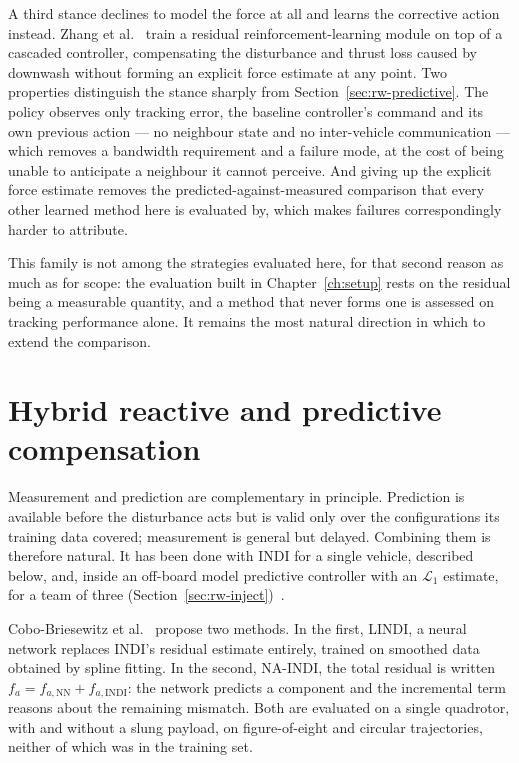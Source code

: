 A third stance declines to model the force at all and learns the corrective action instead. Zhang
et al.~\cite{zhang2024proxfly} train a residual reinforcement-learning module on top of a cascaded
controller, compensating the disturbance and thrust loss caused by downwash without forming an
explicit force estimate at any point. Two properties distinguish the stance sharply from
Section~\ref{sec:rw-predictive}. The policy observes only tracking error, the baseline controller's
command and its own previous action --- no neighbour state and no inter-vehicle communication ---
which removes a bandwidth requirement and a failure mode, at the cost of being unable to anticipate
a neighbour it cannot perceive. And giving up the explicit force estimate removes the
predicted-against-measured comparison that every other learned method here is evaluated by, which
makes failures correspondingly harder to attribute.

This family is not among the strategies evaluated here, for that second reason as much as for
scope: the evaluation built in Chapter~\ref{ch:setup} rests on the residual being a measurable
quantity, and a method that never forms one is assessed on tracking performance alone. It remains
the most natural direction in which to extend the comparison.

\section{Hybrid reactive and predictive compensation}
\label{sec:rw-hybrid}

Measurement and prediction are complementary in principle. Prediction is available before the
disturbance acts but is valid only over the configurations its training data covered; measurement
is general but delayed. Combining them is therefore natural. It has been done with INDI for a single
vehicle, described below, and, inside an off-board model predictive controller with an
$\mathcal{L}_1$ estimate, for a team of three (Section~\ref{sec:rw-inject})~\cite{hsieh2025onlineadaptation}.

Cobo-Briesewitz et al.~\cite{cobobriesewitz2026lindi} propose two methods. In the first, LINDI, a
neural network replaces INDI's residual estimate entirely, trained on smoothed data obtained by
spline fitting. In the second, NA-INDI, the total residual is written \(f_a = f_{a,\mathrm{NN}} +
f_{a,\mathrm{INDI}}\): the network predicts a component and the incremental term reasons about the
remaining mismatch. Both are evaluated on a single quadrotor, with and without
a slung payload, on figure-of-eight and circular trajectories, neither of which was in the
training set.

